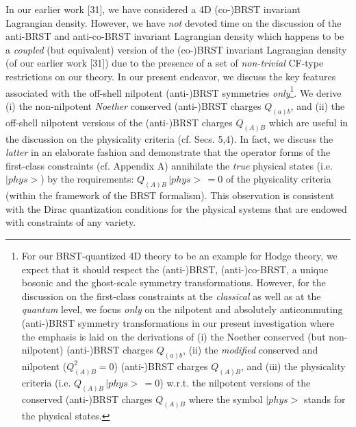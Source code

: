 \documentclass[12pt]{article}
\begin{document}
In our earlier work [31], we have considered a 4D (co-)BRST invariant
Lagrangian density. However, we have {\it not} devoted time on the discussion of the anti-BRST and anti-co-BRST invariant Lagrangian density which happens to be 
a {\it coupled} (but equivalent) version of the (co-)BRST invariant Lagrangian density (of our earlier work [31]) due to the presence of a set
of {\it non-trivial} CF-type restrictions on our theory. In our present endeavor, we discuss the key features associated with the off-shell nilpotent
(anti-)BRST symmetries {\it only}\footnote{For our BRST-quantized 4D theory to be an example for Hodge theory, we expect that it should respect
the (anti-)BRST, (anti-)co-BRST, a unique bosonic and the ghost-scale symmetry transformations. However, for the discussion on the first-class
constraints at the {\it classical} as well as at the {\it quantum} level, we focus {\it only} on the nilpotent and absolutely anticommuting
(anti-)BRST symmetry transformations in our present investigation where the emphasis is laid on the derivations of (i) the Noether conserved
(but non-nilpotent) (anti-)BRST charges $Q_{(a)b}$,  (ii) the {\it modified} conserved and nilpotent ($Q_{(A)B}^2 = 0 $)
(anti-)BRST charges $Q_{(A)B}$, and (iii) the physicality criteria (i.e. $Q_{(A)B} \, |phys>\, = 0$) w.r.t. the nilpotent versions of the
conserved (anti-)BRST charges $Q_{(A)B}$ where the symbol $|phys>$ stands for the physical states.}. 
We derive (i) the non-nilpotent {\it Noether} conserved (anti-)BRST charges $Q_{(a)b}$, and (ii) the
off-shell nilpotent versions  of the (anti-)BRST charges  $Q_{(A)B}$ which are useful in the discussion
on the physicality criteria (cf. Secs. 5,4). In fact, we discuss the {\it latter}  in an elaborate fashion and 
demonstrate that the operator forms of the first-class constraints (cf. Appendix A) annihilate the {\it true} physical states (i.e. $|phys>$) 
by the requirements: $Q_{(A)B} \, |phys>\, = 0$ of the physicality criteria (within the framework of the BRST formalism). This observation is 
consistent with the Dirac quantization conditions for the physical systems that are endowed with constraints of any variety.  


                
\end{document}
